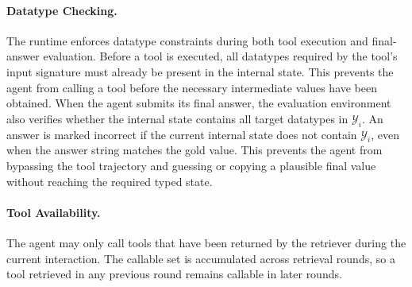 \paragraph{Datatype Checking.}
The runtime enforces datatype constraints during both tool execution and final-answer evaluation. 
Before a tool is executed, all datatypes required by the tool's input signature must already be present in the internal state. 
This prevents the agent from calling a tool before the necessary intermediate values have been obtained. 
When the agent submits its final answer, the evaluation environment also verifies whether the internal state contains all target datatypes in $\mathcal{Y}_i$.
An answer is marked incorrect if the current internal state does not contain $\mathcal{Y}_i$, even when the answer string matches the gold value.
This prevents the agent from bypassing the tool trajectory and guessing or copying a plausible final value without reaching the required typed state.

\paragraph{Tool Availability.}
The agent may only call tools that have been returned by the retriever during the current interaction. 
The callable set is accumulated across retrieval rounds, so a tool retrieved in any previous round remains callable in later rounds. 


